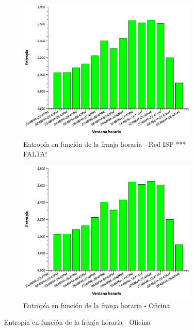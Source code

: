 \begin{figure}[H]
        \begin{subfigure}[H]{0.5\textwidth}
                \centering
                \includegraphics[width=1\textwidth]{graficos/entropiaXHora.pdf}
                \caption{Entrop\'ia en funci\'on de la franja horaria - Red ISP  *** FALTA!}
                \label{fig:paquetes1}
        \end{subfigure}
        \begin{subfigure}[H]{0.5\textwidth}
                \centering
                \includegraphics[width=1\textwidth]{graficos/entropiaXHora.pdf}
                \caption{Entrop\'ia en funci\'on de la franja horaria - Oficina}
                \label{fig:paquetes2}
        \end{subfigure}
\end{figure}

